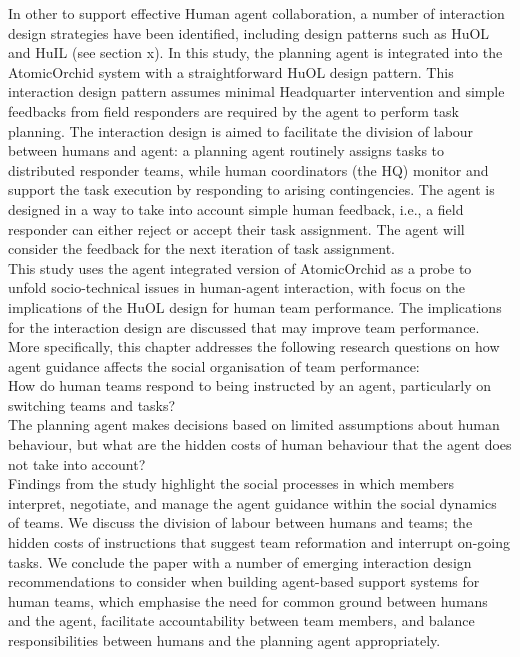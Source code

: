 In other to support effective Human agent collaboration, a number of interaction design strategies have been identified, including design patterns such as HuOL and HuIL (see section x). In this study, the planning agent is integrated into the AtomicOrchid system with a straightforward HuOL design pattern. This interaction design pattern assumes minimal Headquarter intervention and simple feedbacks from field responders are required by the agent to perform task planning. The interaction design is aimed to facilitate the division of labour between humans and agent: a planning agent routinely assigns tasks to distributed responder teams, while human coordinators (the HQ) monitor and support the task execution by responding to arising contingencies. The agent is designed in a way to take into account simple human feedback, i.e., a field responder can either reject or accept their task assignment. The agent will consider the feedback for the next iteration of task assignment.\\


This study uses the agent integrated version of AtomicOrchid as a probe to unfold socio-technical issues in human-agent interaction, with focus on the implications of the HuOL design for human team performance. The implications for the interaction design are discussed that may improve team performance. More specifically, this chapter addresses the following research questions on how agent guidance affects the social organisation of team performance:\\

How do human teams respond to being instructed by an agent, particularly on switching teams and tasks?\\
The planning agent makes decisions based on limited assumptions about human behaviour, but what are the hidden costs of human behaviour that the agent does not take into account?\\

Findings from the study highlight the social processes in which members interpret, negotiate, and manage the agent guidance within the social dynamics of teams. We discuss the division of labour between humans and teams; the hidden costs of instructions that suggest team reformation and interrupt on-going tasks. We conclude the paper with a number of emerging interaction design recommendations to consider when building agent-based support systems for human teams, which emphasise the need for common ground between humans and the agent, facilitate accountability between team members, and balance responsibilities between humans and the planning agent appropriately.\\


